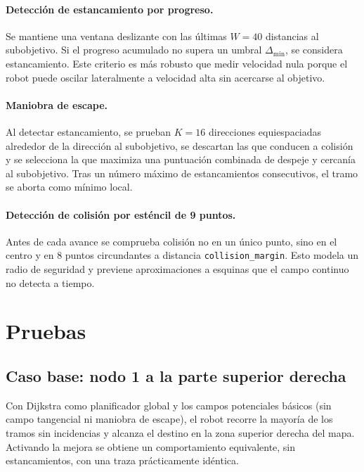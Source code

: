 \paragraph{Detecci\'{o}n de estancamiento por progreso.} Se mantiene una ventana deslizante con las \'{u}ltimas $W = 40$ distancias al subobjetivo. Si el progreso acumulado no supera un umbral $\Delta_\text{min}$, se considera estancamiento. Este criterio es m\'{a}s robusto que medir velocidad nula porque el robot puede oscilar lateralmente a velocidad alta sin acercarse al objetivo.

\paragraph{Maniobra de escape.} Al detectar estancamiento, se prueban $K = 16$ direcciones equiespaciadas alrededor de la direcci\'{o}n al subobjetivo, se descartan las que conducen a colisi\'{o}n y se selecciona la que maximiza una puntuaci\'{o}n combinada de despeje y cercan\'{i}a al subobjetivo. Tras un n\'{u}mero m\'{a}ximo de estancamientos consecutivos, el tramo se aborta como m\'{i}nimo local.

\paragraph{Detecci\'{o}n de colisi\'{o}n por est\'{e}ncil de 9 puntos.} Antes de cada avance se comprueba colisi\'{o}n no en un \'{u}nico punto, sino en el centro y en 8 puntos circundantes a distancia \texttt{collision\_margin}. Esto modela un radio de seguridad y previene aproximaciones a esquinas que el campo continuo no detecta a tiempo.


\section{Pruebas}

\subsection{Caso base: nodo 1 a la parte superior derecha}
Con Dijkstra como planificador global y los campos potenciales b\'{a}sicos (sin campo tangencial ni maniobra de escape), el robot recorre la mayor\'{i}a de los tramos sin incidencias y alcanza el destino en la zona superior derecha del mapa. Activando la mejora se obtiene un comportamiento equivalente, sin estancamientos, con una traza pr\'{a}cticamente id\'{e}ntica.

